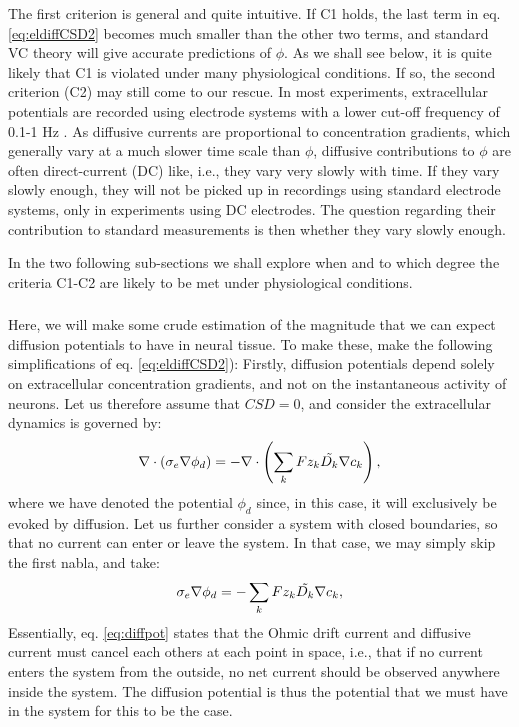 The first criterion is general and quite intuitive. If C1 holds, the last term in eq. \ref{eq:eldiffCSD2} becomes much smaller than the other two terms, and standard VC theory will give accurate predictions of $\phi$. As we shall see below, it is quite likely that C1 is violated under many physiological conditions. If so, the second criterion (C2) may still come to our rescue. In most experiments, extracellular potentials are recorded using electrode systems with a lower cut-off frequency of 0.1-1 Hz \cite{Einevoll2007}. As diffusive currents are proportional to concentration gradients, which generally vary at a much slower time scale than $\phi$, diffusive contributions to $\phi$ are often direct-current (DC) like, i.e., they vary very slowly with time. If they vary slowly enough, they will not be picked up in recordings using standard electrode systems, only in experiments using DC electrodes. The question regarding their contribution to standard measurements is then whether they vary slowly enough. 

In the two following sub-sections we shall explore when and to which degree the criteria C1-C2 are likely to be met under physiological conditions.

\subsubsection{}
Here, we will make some crude estimation of the magnitude that we can expect diffusion potentials to have in neural tissue. To make these, make the following simplifications of eq. \ref{eq:eldiffCSD2}): Firstly, diffusion potentials depend solely on extracellular concentration gradients, and not on the instantaneous activity of neurons. Let us therefore assume that $CSD = 0$, and consider the extracellular dynamics is governed by:
\begin{equation}
\nabla \cdot (\sigma_e\nabla\phi_d) = - \nabla \cdot \left (\sum_k{F z_k \tilde{D_k}{\bf \nabla} c_{k}} \right), 
\label{eq:eldiffCSD3}
\end{equation}
where we have denoted the potential $\phi_d$ since, in this case, it will exclusively be evoked by diffusion. Let us further consider a system with closed boundaries, so that no current can enter or leave the system. In that case, we may simply skip the first nabla, and take:
\begin{equation}
\sigma_e\nabla\phi_d = -\sum_k{F z_k \tilde{D_k}{\bf \nabla} c_{k}}, 
\label{eq:diffpot}
\end{equation}
Essentially, eq. \ref{eq:diffpot} states that the Ohmic drift current and diffusive current must cancel each others at each point in space, i.e., that if no current enters the system from the outside, no net current should be observed anywhere inside the system. The diffusion potential is thus the potential that we must have in the system for this to be the case. 

